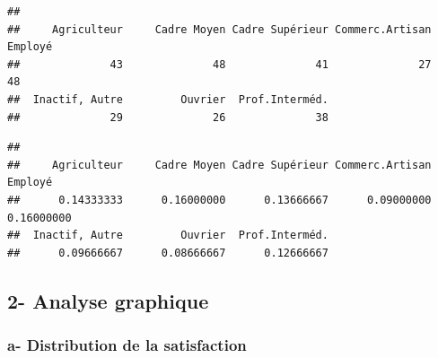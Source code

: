 \documentclass[
]{article}
\newenvironment{Shaded}{\begin{snugshade}}{\end{snugshade}}
\newcommand{\AttributeTok}[1]{\textcolor[rgb]{0.13,0.29,0.53}{#1}}
\newcommand{\CommentTok}[1]{\textcolor[rgb]{0.56,0.35,0.01}{\textit{#1}}}
\newcommand{\FunctionTok}[1]{\textcolor[rgb]{0.13,0.29,0.53}{\textbf{#1}}}
\newcommand{\NormalTok}[1]{#1}
\newcommand{\SpecialCharTok}[1]{\textcolor[rgb]{0.81,0.36,0.00}{\textbf{#1}}}
\newcommand{\StringTok}[1]{\textcolor[rgb]{0.31,0.60,0.02}{#1}}
\begin{document}
\begin{Shaded}
\end{Shaded}

\begin{verbatim}
## 
##     Agriculteur     Cadre Moyen Cadre Supérieur Commerc.Artisan         Employé 
##              43              48              41              27              48 
##  Inactif, Autre         Ouvrier  Prof.Interméd. 
##              29              26              38
\end{verbatim}

\begin{Shaded}
\end{Shaded}

\begin{verbatim}
## 
##     Agriculteur     Cadre Moyen Cadre Supérieur Commerc.Artisan         Employé 
##      0.14333333      0.16000000      0.13666667      0.09000000      0.16000000 
##  Inactif, Autre         Ouvrier  Prof.Interméd. 
##      0.09666667      0.08666667      0.12666667
\end{verbatim}

\subsection{2- Analyse graphique}\label{analyse-graphique}

\subsubsection{a- Distribution de la
satisfaction}\label{a--distribution-de-la-satisfaction}

\begin{Shaded}
\end{Shaded}
\end{document}
